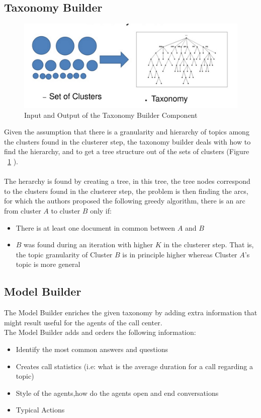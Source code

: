 \documentclass[4pt,a4paper,twocolumn]{article}
\begin{document}
\subsection{Taxonomy Builder}

\begin{figure}[]
  \centering
    \includegraphics[scale=0.2]{pics/taxonomyBuilder.jpg}
    \caption{Input and Output of the Taxonomy Builder Component}
   \label{fig:taxonomyBuilder}  
\end{figure}

Given the assumption that there is a granularity and hierarchy of topics among the clusters found in the clusterer step, the taxonomy builder deals with  how to find the hierarchy, and to get a tree structure out of the sets of clusters (Figure ~\ref{fig:taxonomyBuilder} ).\\
\\
The herarchy is found by creating a tree, in this tree, the tree nodes correspond to the clusters found in the clusterer step, the problem is then finding the arcs, for which the authors proposed the following greedy algorithm, there is an arc from cluster $A$ to cluster $B$ only if:
\begin{itemize}
	\item  There is at least one document in common between $A$ and $B$
	\item  $B$ was found during an iteration with higher $K$ in the clusterer step. That is, the topic granularity of Cluster $B$ is in principle higher whereas Cluster $A$'s topic is more general
\end{itemize}


\subsection{Model Builder}
The Model Builder enriches the given taxonomy by adding extra information that might result useful for the 
agents of the call center.\\
The Model Builder adds and orders the following information:
\begin{itemize}
	\item Identify the most common answers and questions
	\item Creates call statistics (i.e: what is the average duration for a call regarding a topic)
	\item Style of the agents,how do the agents open and end conversations
	\item Typical Actions
\end{itemize}
\end{document}
